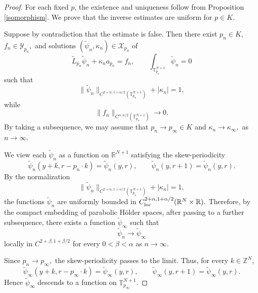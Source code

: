 \documentclass[preprint]{elsarticle}
\numberwithin{equation}{section}
\begin{document}
\begin{proof}
For each fixed $p$, the existence and uniqueness follow from Proposition \ref{isomorphism}. We prove that the inverse estimates are uniform for $p\in K$.

Suppose by contradiction that the estimate is false. Then there exist
$
p_n\in K,$ $ f_n\in\mathcal Y_{p_n},
$
and solutions
$
(\widetilde\psi_n,\kappa_n)\in\mathcal X_{p_n}
$
of
\begin{equation*}
\widetilde L_{p_n}\widetilde\psi_n+\kappa_n a_{p_n}=f_n,
\qquad
\int_{\mathbb T_{p_n}^{N+1}}\widetilde\psi_n=0
\end{equation*}
such that
\begin{equation*}
\|\widetilde\psi_n\|_{C^{2+\alpha,1+\alpha/2}(\mathbb T_{p_n}^{N+1})}
+
|\kappa_n|
=1,
\end{equation*}
while
\begin{equation*}
\|f_n\|_{C^{\alpha,\alpha/2}(\mathbb T_{p_n}^{N+1})}\to0.
\end{equation*}
By taking a subsequence, we may assume that
$
p_n\to p_\infty\in K
$
and
$
\kappa_n\to\kappa_\infty,
$ as $n \to \infty$.


We view each $\widetilde\psi_n$ as a function on $\mathbb R^{N+1}$ satisfying the skew-periodicity
\begin{equation*}
\widetilde\psi_n(y+k,r-p_n\cdot k)=\widetilde\psi_n(y,r),
\qquad
\widetilde\psi_n(y,r+1)=\widetilde\psi_n(y,r).
\end{equation*}
By the normalization
\begin{equation*}
\|\widetilde\psi_n\|_{C^{2+\alpha,1+\alpha/2}(\mathbb T_{p_n}^{N+1})}
+
|\kappa_n|
=1,
\end{equation*}
the functions $\widetilde\psi_n$ are uniformly bounded in
$
C_{\rm loc}^{2+\alpha,1+\alpha/2}(\mathbb R^N\times\mathbb R).
$
Therefore, by the compact embedding of parabolic Hölder spaces, after passing to a further subsequence, there exists a function $\widetilde\psi_\infty$ such that
\begin{equation*}
\widetilde\psi_n\to\widetilde\psi_\infty
\end{equation*}
locally in $C^{2+\beta,1+\beta/2}$ for every $0<\beta<\alpha$  as $n \to \infty$.

Since
$
p_n\to p_\infty,
$
the skew-periodicity passes to the limit. Thus, for every $k\in\mathbb Z^N$,
\begin{equation*}
\widetilde\psi_\infty(y+k,r-p_\infty\cdot k)
=
\widetilde\psi_\infty(y,r),
\qquad
\widetilde\psi_\infty(y,r+1)
=
\widetilde\psi_\infty(y,r).
\end{equation*}
Hence $\widetilde\psi_\infty$ descends to a function on $\mathbb T_{p_\infty}^{N+1}$.


\end{proof}
\end{document}
